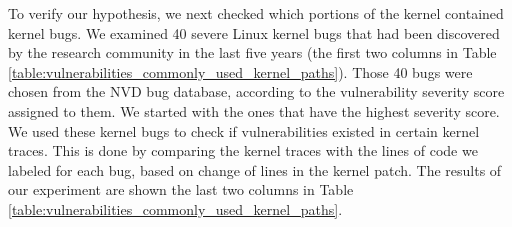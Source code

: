To verify our hypothesis, we next checked which portions of
the kernel contained kernel bugs. We examined 40 severe Linux kernel
bugs that had been discovered by the research community in the last five
years (the first two columns in Table
\ref{table:vulnerabilities_commonly_used_kernel_paths}).
Those 40 bugs were chosen from the NVD bug database, according to
the vulnerability severity score assigned to them. We started with the ones
that have the highest severity score.
We used these kernel bugs to check if vulnerabilities existed in certain
kernel traces. This is done by comparing the kernel traces with the lines
of code we labeled for each bug, based on change of lines in the
kernel patch.
The results of our experiment are shown the last two columns in Table
\ref{table:vulnerabilities_commonly_used_kernel_paths}.

